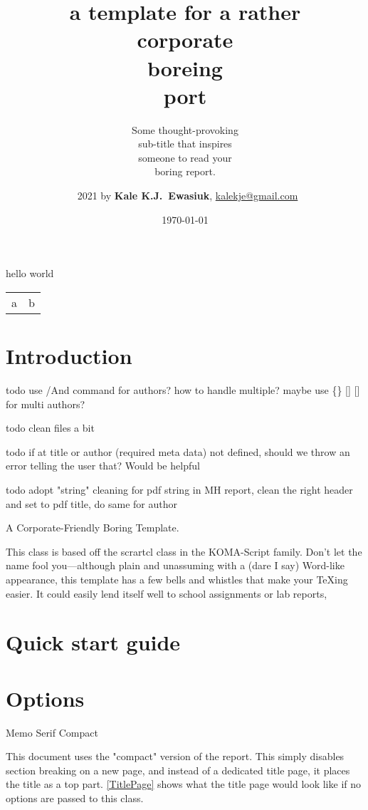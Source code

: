 \documentclass{corpboreport}
\title{a template for a rather \\[0.2ex]
corp{\smaller\smaller\normalfont orate} \\
bore{\smaller\smaller\normalfont ing} \\
\leavevmode\llap{{\smaller\smaller\normalfont re}}port \\[0.1ex]
}
\author{\textcopyright\ 2021 by {\bfseries Kale K.J.\ Ewasiuk}, \url{kalekje@gmail.com}}
\subtitle{%
		Some thought-provoking\\
		sub-title that inspires\\
		someone to read your\\
		boring report.
}
\date{\today}
\begin{document}


	\begin{LTXexample}
		hello world

		\begin{tabular}{ l l }
			a & b \\
		\end{tabular}
	\end{LTXexample}

\maketitle


%

\section{Introduction}
todo use /And command for authors? how to handle multiple? maybe use \{\} [] [] for multi authors?

todo clean files a bit

todo if at title or author (required meta data) not defined, should we throw an error telling the user that? Would be helpful

todo adopt "string" cleaning for pdf string in MH report, clean the right header and set to pdf title, do same for author

A Corporate-Friendly Boring Template.

This class is based off the scrartcl class in the KOMA-Script family.
Don't let the name fool you---although plain and unassuming with a (dare I say) Word-like appearance,
this template has a few bells and whistles that make your TeXing easier.
It could easily lend itself well to school assignments or lab reports,

\section{Quick start guide}

\section{Options}
Memo
Serif
Compact


This document uses the "compact" version of the report. This simply disables section breaking on a new page,
and instead of a dedicated title page, it places the title as a top part. \cref{TitlePage} shows
what the title page would look like if no options are passed to this class.
\end{document}
